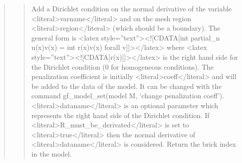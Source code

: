 \documentclass[a4paper,11pt,english]{sphinxmanual}
\begin{document}
\begin{quote}
\sphinxAtStartPar
{}
\begin{quote}

\sphinxAtStartPar
Add a Dirichlet condition on the normal derivative of the variable
\textless{}literal\textgreater{}varname\textless{}/literal\textgreater{} and on the mesh region \textless{}literal\textgreater{}region\textless{}/literal\textgreater{} (which should be a boundary).
The general form is
\textless{}latex style=”text”\textgreater{}\textless{}!{[}CDATA{[}int partial\_n u(x)v(x) = int r(x)v(x) forall v{]}{]}\textgreater{}\textless{}/latex\textgreater{}
where \textless{}latex style=”text”\textgreater{}\textless{}!{[}CDATA{[}r(x){]}{]}\textgreater{}\textless{}/latex\textgreater{} is
the right hand side for the Dirichlet condition (0 for
homogeneous conditions).
The penalization coefficient
is initially \textless{}literal\textgreater{}coeff\textless{}/literal\textgreater{} and will be added to the data of the model.
It can be changed with the command gf\_model\_set(model M, ‘change penalization coeff’).
\textless{}literal\textgreater{}dataname\textless{}/literal\textgreater{} is an optional parameter which represents
the right hand side of the Dirichlet condition.
If \textless{}literal\textgreater{}R\_must\_be\_derivated\textless{}/literal\textgreater{} is set to \textless{}literal\textgreater{}true\textless{}/literal\textgreater{} then the normal
derivative of \textless{}literal\textgreater{}dataname\textless{}/literal\textgreater{} is considered.
Return the brick index in the model.
\end{quote}

\sphinxAtStartPar
{}
\begin{quote}


\end{quote}
\end{quote}
\end{document}
